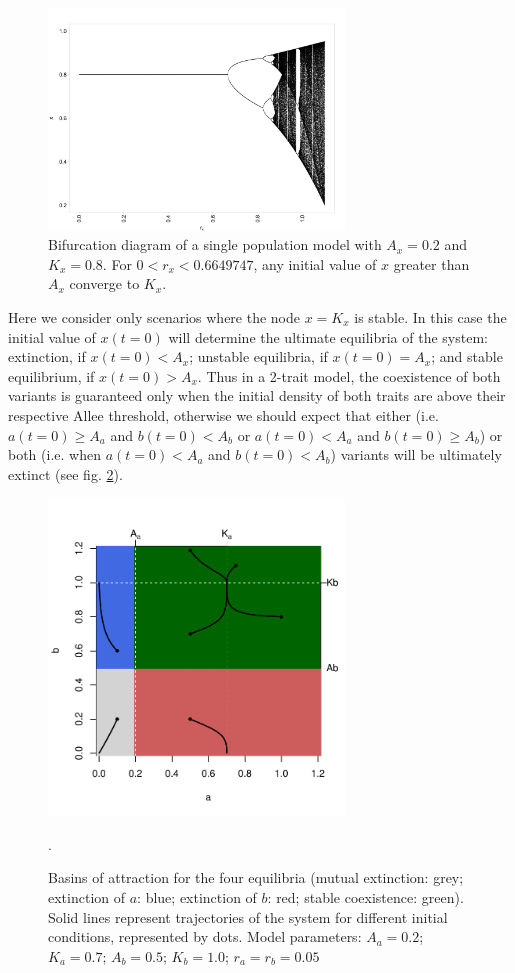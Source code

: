 \documentclass[preprint,authoryear]{elsarticle}
\begin{document}
\begin{figure}[h!]
  \centering
      \includegraphics[width=0.7\textwidth]{./figures/figure1.jpg}
  \caption{Bifurcation diagram of a single population model with $A_x=0.2$ and $K_x=0.8$. For $0<r_x<0.6649747$, any initial value of $x$ greater than $A_x$ converge to $K_x$.}
    \label{fig:bifurcationDiagram}
\end{figure}

Here we consider only scenarios where the node $x=K_x$ is stable. In this case the initial value of $x(t=0)$ will determine the ultimate equilibria of the system: extinction, if $x(t=0)<A_x$; unstable equilibria, if $x(t=0)=A_x$; and stable equilibrium, if $x(t=0)>A_x$. Thus in a 2-trait model, the coexistence of both variants is guaranteed only when the initial density of both traits are above their respective Allee threshold, otherwise we should expect that either (i.e. $a(t=0) \geq A_a$ and $b(t=0)<A_b$ or $a(t=0)<A_a$ and $b(t=0) \geq A_b$) or both (i.e. when $a(t=0)<A_a$ and $b(t=0)<A_b$) variants will be ultimately extinct (see fig. \ref{fig:NoTransmissionBasin}). 

\begin{figure}[h!]
  \centering
      \includegraphics[width=0.7\textwidth]{./figures/figure2.pdf}
  \caption{Basins of attraction for the four equilibria (mutual extinction: grey; extinction of $a$: blue; extinction of $b$: red; stable coexistence: green). Solid lines represent trajectories of the system for different initial conditions, represented by dots. Model parameters: $A_a=0.2$; $K_a=0.7$; $A_b=0.5$; $K_b=1.0$; $r_a=r_b=0.05$}.
    \label{fig:NoTransmissionBasin}
\end{figure}
\end{document}
